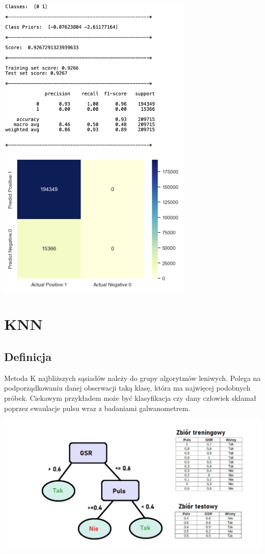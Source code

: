 \documentclass{article}
\begin{document}
{\begin{itemize}
\begin{lstlisting}
    \end{lstlisting}
    \begin{center}
    \includegraphics[width=0.7\textwidth]{image9.png}\newline
\end{center}
\end{itemize}
\newpage

\section{\LARGE{KNN}}
\subsection{Definicja}
\large{Metoda K najbliższych sąsiadów należy do grupy algorytmów leniwych. Polega na podporządkowaniu danej obserwacji taką klasę, która ma najwięcej podobnych próbek. \newline\newline
Ciekawym przykładem może być klasyfikacja czy dany człowiek skłamał poprzez ewaulacje pulsu wraz z badaniami galwanometrem.}
    \begin{center}
    \includegraphics[width=1.0\textwidth]{puls.png}\newline
\end{center}
\newpage
}
\end{document}
